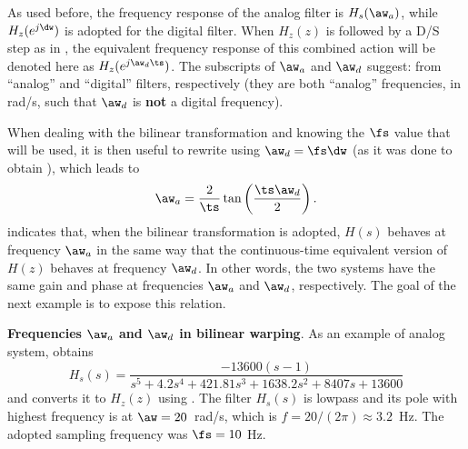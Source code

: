 As used before, the frequency response of the analog filter is $H_s(\aw_a)$, while $H_z(e^{j \dw})$
is adopted for the digital filter. When $H_z(z)$ is followed by a D/S step as in
, the equivalent frequency response of this combined action will be denoted here as $H_z(e^{j \aw_d \ts})$.
The subscripts of $\aw_a$ and $\aw_d$ suggest: from ``analog'' and ``digital'' filters, respectively
(they are both ``analog'' frequencies, in rad/s, such that $\aw_d$ is \textbf{not} a digital frequency).

When dealing with the bilinear transformation and knowing the $\fs$ value that will be used, it is then useful to
rewrite  using $\aw_d = \fs \dw$ (as it was done to obtain ), which leads to
\begin{equation}
\aw_a = \frac{2}{\ts} \tan \left( \frac{\ts \aw_d}{2} \right).
\label{eq:prewarping2}
\end{equation}
 indicates that, when the bilinear transformation is adopted, $H(s)$ behaves at frequency $\aw_a$ in the same way that the continuous-time equivalent version of $H(z)$ behaves at frequency $\aw_d$. In other words, the two systems have the same gain and phase at frequencies $\aw_a$ and $\aw_d$, respectively.
The goal of the next example is to expose this relation. %

\bExample \textbf{Frequencies $\aw_a$ and $\aw_d$ in bilinear warping}.
\label{ex:bilinearWarpingFrequencies}
As an example of analog system,  obtains
\begin{equation}
H_s(s) = \frac{-13600(s-1)}{s^5+4.2s^4+421.81s^3+1638.2 s^2 + 8407 s + 13600}
\label{eq:example_of_Hs}
\end{equation}
and converts it to $H_z(z)$ using . The filter $H_s(s)$ is lowpass and its pole
with highest frequency is at $\aw=20$~rad/s, which is $f=20/(2\pi)\approx 3.2$~Hz. The adopted
sampling frequency was $\fs=10$ Hz.


